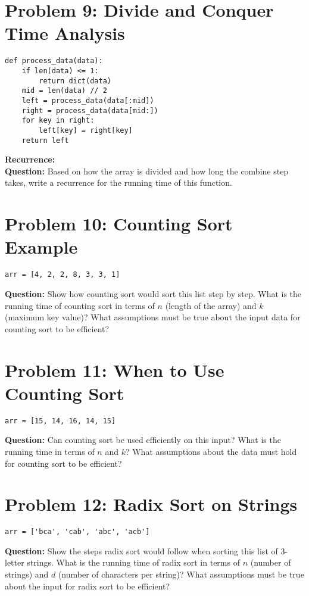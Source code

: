 \documentclass[12pt]{article}
\begin{document}
\vspace{2em}

\section*{Problem 9: Divide and Conquer Time Analysis}
\begin{verbatim}
def process_data(data):
    if len(data) <= 1:
        return dict(data)
    mid = len(data) // 2
    left = process_data(data[:mid])
    right = process_data(data[mid:])
    for key in right:
        left[key] = right[key]
    return left
\end{verbatim}
\textbf{Recurrence:} \underline{\hspace{10cm}} \\
\textbf{Question:} Based on how the array is divided and how long the combine step takes, write a recurrence for the running time of this function.

\vspace{2em}

\section*{Problem 10: Counting Sort Example}
\begin{verbatim}
arr = [4, 2, 2, 8, 3, 3, 1]
\end{verbatim}
\textbf{Question:} Show how counting sort would sort this list step by step. What is the running time of counting sort in terms of $n$ (length of the array) and $k$ (maximum key value)? What assumptions must be true about the input data for counting sort to be efficient?

\vspace{2em}

\section*{Problem 11: When to Use Counting Sort}
\begin{verbatim}
arr = [15, 14, 16, 14, 15]
\end{verbatim}
\textbf{Question:} Can counting sort be used efficiently on this input? What is the running time in terms of $n$ and $k$? What assumptions about the data must hold for counting sort to be efficient?

\vspace{2em}

\section*{Problem 12: Radix Sort on Strings}
\begin{verbatim}
arr = ['bca', 'cab', 'abc', 'acb']
\end{verbatim}
\textbf{Question:} Show the steps radix sort would follow when sorting this list of 3-letter strings. What is the running time of radix sort in terms of $n$ (number of strings) and $d$ (number of characters per string)? What assumptions must be true about the input for radix sort to be efficient?
\end{document}
